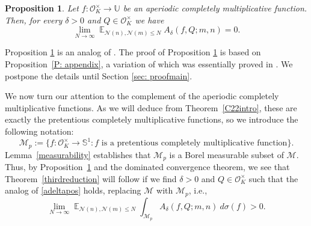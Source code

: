 \documentclass[11pt]{amsart}
\newtheorem{proposition}[lemma]{Proposition}
\theoremstyle{definition}
\DeclareMathOperator*{\E}{\mathbb{E}}
\newcommand{\NN}{{\mathcal N}}
\renewcommand{\S}{\mathbb{S}}
\newcommand{\U}{{\mathbb U}}
\begin{document}
\begin{proposition}\label{aperiodiclimit0}
Let $f: \mathcal{O}_K^{\times} \to \U$ be an aperiodic completely multiplicative function. Then, for every $\delta>0$ and $Q \in \mathcal{O}_K^{\times}$ we have
\begin{equation}
\lim_{N \to \infty} \E_{\NN(n),\NN(m) \leq N} A_{\delta}(f,Q; m,n)=0.
\end{equation}
\end{proposition}
Proposition \ref{aperiodiclimit0} is an analog of \cite[Proposition~4.1]{FKM1}.
The proof of Proposition \ref{aperiodiclimit0} is based on Proposition~\ref{P: appendix}, a variation of which was essentially proved in \cite{S23}. We postpone the details until Section \ref{sec: proofmain}.

We now turn our attention to the complement of the aperiodic completely multiplicative functions. As we will deduce from Theorem~\ref{C22intro}, these are exactly the pretentious completely multiplicative functions, so we introduce the following notation:
\begin{equation}
\mathcal{M}_p:=\{ f: \mathcal{O}_K^{\times} \to \S^1 : f \text{ is a pretentious completely multiplicative function}\}.
\end{equation}
Lemma~\ref{measurability} establishes that $\mathcal{M}_p$ is a Borel measurable subset of $\mathcal{M}$. Thus, by Proposition~\ref{aperiodiclimit0} and the dominated convergence theorem, we see that Theorem~\ref{thirdreduction} will follow if we find $\delta>0$ and $Q \in \mathcal{O}_K^{\times}$ such that the analog of \eqref{adeltapos} holds, replacing $\mathcal{M}$ with $\mathcal{M}_p$, i.e.,
\begin{equation}\label{adeltaposPret}
\lim_{N \to \infty} \E_{\NN(n),\NN(m) \leq N} \int_{\mathcal{M}_p} A_{\delta}(f,Q;m,n) \ d\sigma(f)>0.
\end{equation}
\end{document}
